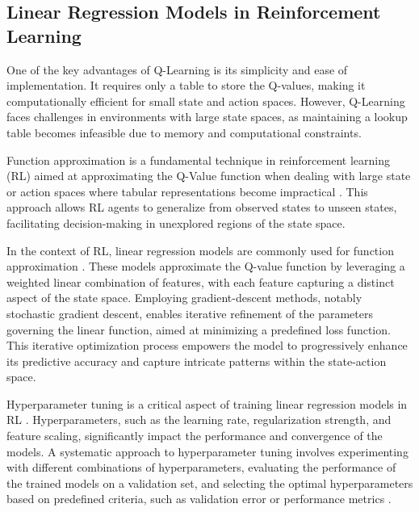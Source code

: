 
\subsection{Linear Regression Models in Reinforcement Learning}

One of the key advantages of Q-Learning is its simplicity and ease of implementation. It requires only a table to store the Q-values, making it computationally efficient for small state and action spaces. However, Q-Learning faces challenges in environments with large state spaces, as maintaining a lookup table becomes infeasible due to memory and computational constraints.

Function approximation is a fundamental technique in reinforcement learning (RL) aimed at approximating the Q-Value function when dealing with large state or action spaces where tabular representations become impractical \cite{russel2020ai}. This approach allows RL agents to generalize from observed states to unseen states, facilitating decision-making in unexplored regions of the state space.

In the context of RL, linear regression models are commonly used for function approximation \cite{sutton2018reinforcement}.  These models approximate the Q-value function by leveraging a weighted linear combination of features, with each feature capturing a distinct aspect of the state space. Employing gradient-descent methods, notably stochastic gradient descent, enables iterative refinement of the parameters governing the linear function, aimed at minimizing a predefined loss function. This iterative optimization process empowers the model to progressively enhance its predictive accuracy and capture intricate patterns within the state-action space.

Hyperparameter tuning is a critical aspect of training linear regression models in RL \cite{bergstra2012random}. Hyperparameters, such as the learning rate, regularization strength, and feature scaling, significantly impact the performance and convergence of the models. A systematic approach to hyperparameter tuning involves experimenting with different combinations of hyperparameters, evaluating the performance of the trained models on a validation set, and selecting the optimal hyperparameters based on predefined criteria, such as validation error or performance metrics \cite{russel2020ai}.


